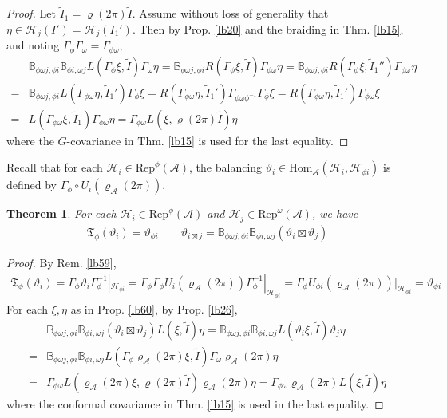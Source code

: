 \documentclass[11pt,b5paper,notitlepage]{article}
\theoremstyle{definition}
\theoremstyle{plain}
\newtheorem{thm}[df]{Theorem}
\newcommand{\fk}{\mathfrak}
\newcommand{\wtd}{\widetilde}
\newcommand{\Hom}{\mathrm{Hom}}
\newcommand{\Rep}{\mathrm{Rep}}
\renewcommand{\Bbb}{\mathbb B}
\newcommand{\MA}{\mathcal A}
\newcommand{\MH}{\mathcal H}
\numberwithin{equation}{section}
\begin{document}
\begin{appendices}
\begin{proof}
Let $\wtd I_1=\varrho(2\pi)\wtd I$. Assume without loss of generality that $\eta\in\MH_j(I')=\MH_j(I_1')$. Then by Prop. \ref{lb20} and the braiding in Thm. \ref{lb15}, and noting $\Gamma_\phi\Gamma_\omega=\Gamma_{\phi\omega}$,
\begin{align*}
&\Bbb_{\phi\omega j,\phi i}\Bbb_{\phi i,\omega j}L(\Gamma_\phi\xi,\wtd I)\Gamma_\omega\eta=\Bbb_{\phi\omega j,\phi i}R(\Gamma_\phi\xi,\wtd I)\Gamma_{\phi\omega}\eta=\Bbb_{\phi\omega j,\phi i}R(\Gamma_\phi\xi,\wtd I_1'')\Gamma_{\phi\omega}\eta\\
=&\Bbb_{\phi\omega j,\phi i}L(\Gamma_{\phi\omega}\eta,\wtd I_1')\Gamma_\phi\xi=R(\Gamma_{\phi\omega}\eta,\wtd I_1')\Gamma_{\phi\omega\phi^{-1}}\Gamma_\phi\xi=R(\Gamma_{\phi\omega}\eta,\wtd I_1')\Gamma_{\phi\omega}\xi\\
=&L(\Gamma_{\phi\omega}\xi,\wtd I_1)\Gamma_{\phi\omega}\eta=\Gamma_{\phi\omega}L(\xi,\varrho(2\pi)\wtd I)\eta
\end{align*}
where the $G$-covariance in Thm. \ref{lb15} is used for the last equality.
\end{proof}

Recall that for each $\MH_i\in\Rep^\phi(\MA)$, the balancing $\vartheta_i\in\Hom_\MA(\MH_i,\MH_{\phi i})$ is defined by $\Gamma_\phi\circ U_i(\varrho_\MA(2\pi))$.

\begin{thm}
For each $\MH_i\in\Rep^\phi(\MA)$ and $\MH_j\in\Rep^\omega(\MA)$, we have 
\begin{gather*}
\fk T_\phi(\vartheta_i)=\vartheta_{\phi i}\qquad \vartheta_{i\boxtimes j}=\Bbb_{\phi\omega j,\phi i}\Bbb_{\phi i,\omega j}(\vartheta_i\boxtimes\vartheta_j)
\end{gather*}
\end{thm}


\begin{proof}
By Rem. \ref{lb59},
\begin{align*}
\fk T_\phi(\vartheta_i)=\Gamma_\phi\vartheta_i\Gamma_\phi^{-1}|_{\MH_{\phi i}}=\Gamma_\phi\Gamma_\phi U_i(\varrho_\MA(2\pi))\Gamma_\phi^{-1}|_{\MH_{\phi i}}=\Gamma_\phi U_{\phi i}(\varrho_\MA(2\pi))|_{\MH_{\phi i}}=\vartheta_{\phi i}
\end{align*}
For each $\xi,\eta$ as in Prop. \ref{lb60}, by Prop. \ref{lb26},
\begin{align*}
&\Bbb_{\phi\omega j,\phi i}\Bbb_{\phi i,\omega j}(\vartheta_i\boxtimes\vartheta_j)L(\xi,\wtd I)\eta=\Bbb_{\phi\omega j,\phi i}\Bbb_{\phi i,\omega j}L(\vartheta_i\xi,\wtd I)\vartheta_j\eta\\
=&\Bbb_{\phi\omega j,\phi i}\Bbb_{\phi i,\omega j}L(\Gamma_\phi\varrho_\MA(2\pi)\xi,\wtd I)\Gamma_\omega\varrho_\MA(2\pi)\eta\\
=&\Gamma_{\phi\omega}L(\varrho_\MA(2\pi)\xi,\varrho(2\pi)\wtd I)\varrho_\MA(2\pi)\eta=\Gamma_{\phi\omega}\varrho_\MA(2\pi)L(\xi,\wtd I)\eta
\end{align*}
where the conformal covariance in Thm. \ref{lb15} is used in the last equality.
\end{proof}



\end{appendices}
\end{document}
